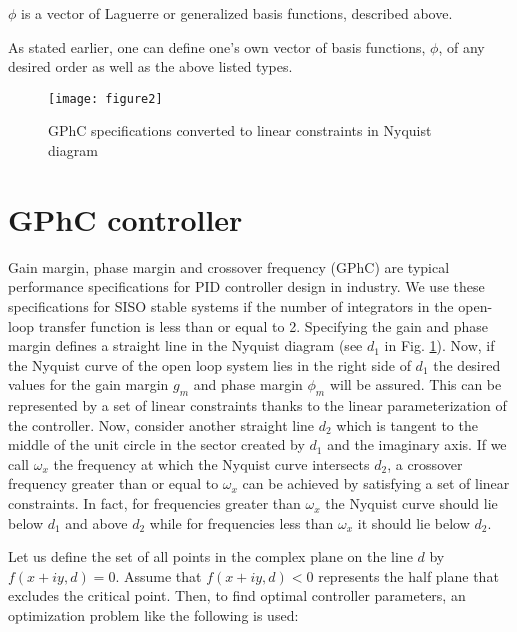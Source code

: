 \documentclass [12pt , a4paper] {report}
\begin{document}
$\phi$ is a vector of Laguerre or generalized basis functions, described above. 



As stated earlier, one can define one's own vector of basis functions, $\phi$, of any desired order as well as the above listed types.

\begin{figure}
\centering
{}
\texttt{[image: figure2]}
\caption{GPhC specifications converted to linear constraints in Nyquist diagram}
\label{fig:GPhC}
\end{figure}

\section{GPhC controller}
Gain margin, phase margin and crossover frequency (GPhC) are typical performance specifications for PID controller design in industry. We use these specifications for SISO stable systems if the number of integrators in the open-loop transfer function is less than or equal to 2. Specifying the gain and phase margin defines a straight line in the Nyquist diagram (see $d_1$ in Fig. \ref{fig:GPhC}). Now, if the Nyquist curve of the open loop system lies in the right side of $d_1$ the desired values for the gain margin $g_m$ and phase margin $\phi_m$ will be assured. This can be represented by a set of linear constraints thanks to the linear parameterization of the controller. Now, consider another straight line $d_2$ which is tangent to the middle of the unit circle in the sector created by $d_1$ and the imaginary axis. If we call $\omega_x$ the frequency at which the Nyquist curve intersects $d_2$, a crossover frequency greater than or equal to $\omega_x$ can be achieved by satisfying a set of linear constraints. In fact, for frequencies greater than $\omega_x$ the Nyquist curve should lie below $d_1$ and above $d_2$ while for frequencies less than $\omega_x$ it should lie below $d_2$.

Let us define the set of all points in the complex plane on the line $d$ by $f(x+iy, d) = 0$. Assume that $f(x+iy, d) < 0$ represents the half plane that excludes the critical point. Then, to find optimal controller parameters, an optimization problem like the following is used:
\end{document}

